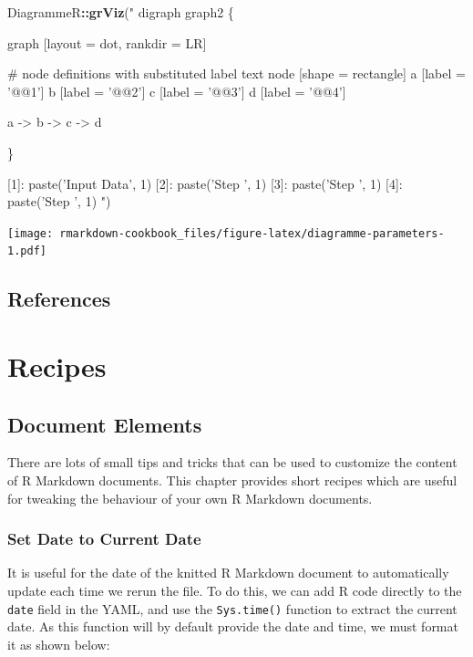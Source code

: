 \documentclass[]{book}
\newenvironment{Shaded}{\begin{snugshade}}{\end{snugshade}}
\newcommand{\KeywordTok}[1]{\textcolor[rgb]{0.13,0.29,0.53}{\textbf{#1}}}
\newcommand{\StringTok}[1]{\textcolor[rgb]{0.31,0.60,0.02}{#1}}
\newcommand{\OperatorTok}[1]{\textcolor[rgb]{0.81,0.36,0.00}{\textbf{#1}}}
\newcommand{\NormalTok}[1]{#1}
\begin{document}
\begin{Shaded}
\begin{Highlighting}[]
\NormalTok{DiagrammeR}\OperatorTok{::}\KeywordTok{grViz}\NormalTok{(}\StringTok{"}
\StringTok{digraph graph2 \{}

\StringTok{graph [layout = dot, rankdir = LR]}

\StringTok{# node definitions with substituted label text}
\StringTok{node [shape = rectangle]}
\StringTok{a [label = '@@1']}
\StringTok{b [label = '@@2']}
\StringTok{c [label = '@@3']}
\StringTok{d [label = '@@4']}

\StringTok{a -> b -> c -> d}

\StringTok{\}}

\StringTok{[1]: paste('Input Data', 1)}
\StringTok{[2]: paste('Step ', 1)}
\StringTok{[3]: paste('Step ', 1)}
\StringTok{[4]: paste('Step ', 1)}
\StringTok{"}\NormalTok{)}
\end{Highlighting}
\end{Shaded}

\texttt{[image: rmarkdown-cookbook\_files/figure-latex/diagramme-parameters-1.pdf]}

\chapter{References}\label{references}

\part{Recipes}\label{part-recipes}

\chapter{Document Elements}\label{document-elements}

There are lots of small tips and tricks that can be used to customize
the content of R Markdown documents. This chapter provides short recipes
which are useful for tweaking the behaviour of your own R Markdown
documents.

\section{Set Date to Current Date}\label{set-date-to-current-date}

It is useful for the date of the knitted R Markdown document to
automatically update each time we rerun the file. To do this, we can add
R code directly to the \texttt{date} field in the YAML, and use the
\texttt{Sys.time()} function to extract the current date. As this
function will by default provide the date and time, we must format it as
shown below:
\end{document}
